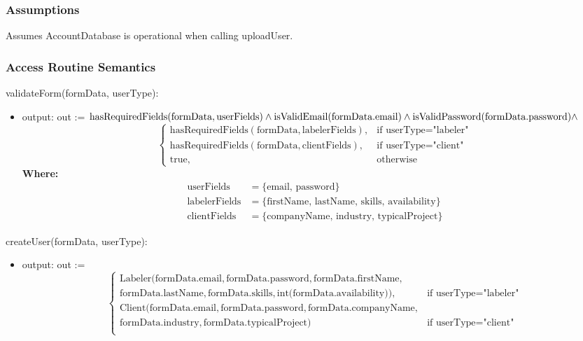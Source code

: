 \documentclass[12pt, titlepage]{article}
\begin{document}
\subsubsection{Assumptions}
Assumes AccountDatabase is operational when calling uploadUser.

\subsubsection{Access Routine Semantics}
\noindent validateForm(formData, userType):
\begin{itemize}
\item output: out := 
$ \text{hasRequiredFields}(\text{formData}, \text{userFields}) \land \nonumber
    \text{isValidEmail}(\text{formData.email}) \land \nonumber \\
    \text{isValidPassword}(\text{formData.password}) \land $
\[
\begin{cases}
    \text{hasRequiredFields}(\text{formData}, \text{labelerFields}), & \text{if } \text{userType} = \text{"labeler"} \\
    \text{hasRequiredFields}(\text{formData}, \text{clientFields}), & \text{if } \text{userType} = \text{"client"} \\
    \text{true}, & \text{otherwise}
\end{cases}
\]
\textbf{Where:}
\begin{align*}
    \text{userFields} &= \{ \text{email, password} \} \\
    \text{labelerFields} &= \{ \text{firstName, lastName, skills, availability} \} \\
    \text{clientFields} &= \{ \text{companyName, industry, typicalProject} \}
\end{align*}
\end{itemize}

\noindent createUser(formData, userType):
\begin{itemize}
\item output: out := 
\[
\begin{cases}
    \text{Labeler}(\text{formData.email}, \text{formData.password}, \text{formData.firstName}, \\ \text{formData.lastName}, \text{formData.skills}, \text{int(formData.availability)}), & \text{if } \text{userType} = \text{"labeler"} \\
    \text{Client}(\text{formData.email}, \text{formData.password}, \text{formData.companyName}, \\ \text{formData.industry}, \text{formData.typicalProject}) & \text{if } \text{userType} = \text{"client"} \\
\end{cases}
\]
\end{itemize}
\end{document}
